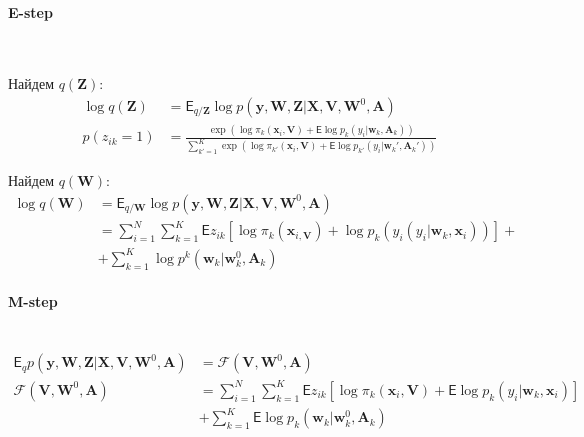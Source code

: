 \documentclass[12pt, twoside]{article}
\numberwithin{equation}{section}
\begin{document}
\paragraph{E-step}~

Найдем $q\left(\textbf{Z}\right)$:
\begin{equation}
\label{eq:st:5}
\begin{aligned}
\log q\left(\textbf{Z}\right) &= \mathsf{E}_{q/\textbf{Z}}\log p\left(\textbf{y}, \textbf{W}, \textbf{Z}|\textbf{X}, \textbf{V}, \textbf{W}^{0}, \textbf{A}\right) \\
p\left(z_{ik} = 1\right) &= \frac{\exp\left(\log\pi_{k}\left(\textbf{x}_{i}, \textbf{V}\right) + \mathsf{E}\log p_{k}\left(y_i|\textbf{w}_k, \textbf{A}_k\right)\right)}{\sum_{k'=1}^{K}\exp\left(\log\pi_{k'}\left(\textbf{x}_{i}, \textbf{V}\right) + \mathsf{E}\log p_{k'}\left(y_i|\textbf{w}_k', \textbf{A}_k'\right)\right)}
\end{aligned}
\end{equation}

Найдем $q\left(\textbf{W}\right)$:
\begin{equation}
\label{eq:st:6}
\begin{aligned}
\log q\left(\textbf{W}\right) &= \mathsf{E}_{q/\textbf{W}}\log p\left(\textbf{y}, \textbf{W}, \textbf{Z}|\textbf{X}, \textbf{V}, \textbf{W}^{0}, \textbf{A}\right) \\
&= \sum_{i=1}^{N}\sum_{k=1}^{K}\mathsf{E}z_{ik}\left[\log\pi_{k}\left(\textbf{x}_{i, \textbf{V}}\right) + \log p_{k}\left(y_{i}\left(y_{i}|\textbf{w}_{k}, \textbf{x}_i\right)\right)\right] + \\
&+ \sum_{k=1}^{K}\log p^{k}\left(\textbf{w}_{k}|\textbf{w}^{0}_{k}, \textbf{A}_{k}\right)
\end{aligned}
\end{equation}

\paragraph{M-step}~
\begin{equation}
\label{eq:st:7}
\begin{aligned}
\mathsf{E}_{q} p\left(\textbf{y}, \textbf{W}, \textbf{Z}|\textbf{X}, \textbf{V}, \textbf{W}^{0}, \textbf{A}\right) &= \mathcal{F}\left(\textbf{V}, \textbf{W}^{0}, \textbf{A}\right) \\
\mathcal{F}\left(\textbf{V}, \textbf{W}^{0}, \textbf{A}\right) &= \sum_{i=1}^{N}\sum_{k=1}^{K}\mathsf{E}z_{ik}\left[\log\pi_k\left(\textbf{x}_i, \textbf{V}\right) + \mathsf{E}\log p_{k}\left(y_i|\textbf{w}_{k}, \textbf{x}_{i}\right)\right] \\
&+ \sum_{k=1}^{K}\mathsf{E}\log p_{k}\left(\textbf{w}_{k}|\textbf{w}^{0}_{k}, \textbf{A}_{k}\right)
\end{aligned}
\end{equation}
\end{document}
